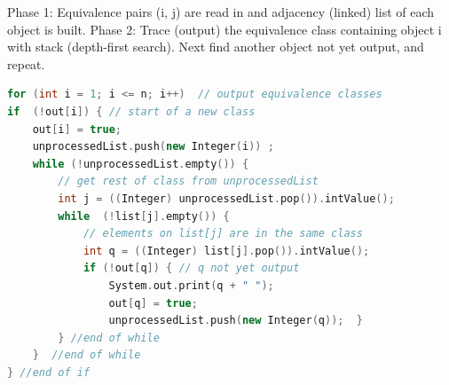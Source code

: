 \documentclass[a4paper,11pt,twoside]{book}
\begin{document}
	
	
	Phase 1: Equivalence pairs (i, j) are read in and adjacency (linked) list of each object is built. Phase 2: Trace (output) the equivalence class containing object i with stack (depth-first search). Next find another object not yet output, and repeat.
	
\begin{lstlisting}[frame=single, language=c++, basicstyle=\scriptsize]
for (int i = 1; i <= n; i++)  // output equivalence classes
if  (!out[i]) { // start of a new class
	out[i] = true;
	unprocessedList.push(new Integer(i)) ;
	while (!unprocessedList.empty()) { 
		// get rest of class from unprocessedList
		int j = ((Integer) unprocessedList.pop()).intValue();
		while  (!list[j].empty()) { 
			// elements on list[j] are in the same class
			int q = ((Integer) list[j].pop()).intValue();
			if (!out[q]) { // q not yet output
				System.out.print(q + " ");
				out[q] = true;
				unprocessedList.push(new Integer(q));  }
		} //end of while
	}  //end of while 
} //end of if	
\end{lstlisting}		
\end{document}
